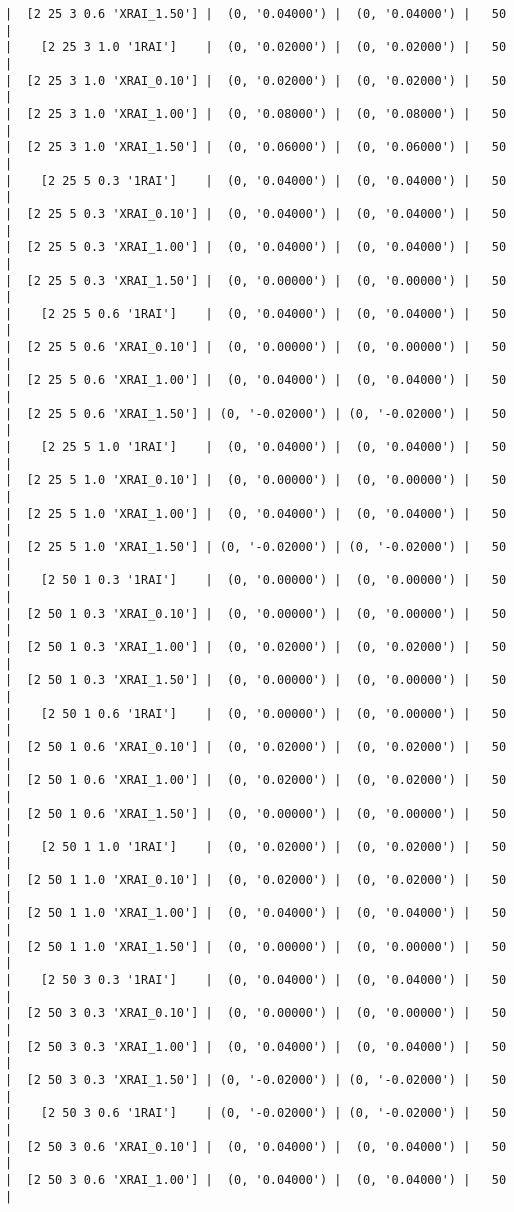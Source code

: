 \documentclass{article}
\begin{document}
\begin{verbatim}
|  [2 25 3 0.6 'XRAI_1.50'] |  (0, '0.04000') |  (0, '0.04000') |   50  |
|    [2 25 3 1.0 '1RAI']    |  (0, '0.02000') |  (0, '0.02000') |   50  |
|  [2 25 3 1.0 'XRAI_0.10'] |  (0, '0.02000') |  (0, '0.02000') |   50  |
|  [2 25 3 1.0 'XRAI_1.00'] |  (0, '0.08000') |  (0, '0.08000') |   50  |
|  [2 25 3 1.0 'XRAI_1.50'] |  (0, '0.06000') |  (0, '0.06000') |   50  |
|    [2 25 5 0.3 '1RAI']    |  (0, '0.04000') |  (0, '0.04000') |   50  |
|  [2 25 5 0.3 'XRAI_0.10'] |  (0, '0.04000') |  (0, '0.04000') |   50  |
|  [2 25 5 0.3 'XRAI_1.00'] |  (0, '0.04000') |  (0, '0.04000') |   50  |
|  [2 25 5 0.3 'XRAI_1.50'] |  (0, '0.00000') |  (0, '0.00000') |   50  |
|    [2 25 5 0.6 '1RAI']    |  (0, '0.04000') |  (0, '0.04000') |   50  |
|  [2 25 5 0.6 'XRAI_0.10'] |  (0, '0.00000') |  (0, '0.00000') |   50  |
|  [2 25 5 0.6 'XRAI_1.00'] |  (0, '0.04000') |  (0, '0.04000') |   50  |
|  [2 25 5 0.6 'XRAI_1.50'] | (0, '-0.02000') | (0, '-0.02000') |   50  |
|    [2 25 5 1.0 '1RAI']    |  (0, '0.04000') |  (0, '0.04000') |   50  |
|  [2 25 5 1.0 'XRAI_0.10'] |  (0, '0.00000') |  (0, '0.00000') |   50  |
|  [2 25 5 1.0 'XRAI_1.00'] |  (0, '0.04000') |  (0, '0.04000') |   50  |
|  [2 25 5 1.0 'XRAI_1.50'] | (0, '-0.02000') | (0, '-0.02000') |   50  |
|    [2 50 1 0.3 '1RAI']    |  (0, '0.00000') |  (0, '0.00000') |   50  |
|  [2 50 1 0.3 'XRAI_0.10'] |  (0, '0.00000') |  (0, '0.00000') |   50  |
|  [2 50 1 0.3 'XRAI_1.00'] |  (0, '0.02000') |  (0, '0.02000') |   50  |
|  [2 50 1 0.3 'XRAI_1.50'] |  (0, '0.00000') |  (0, '0.00000') |   50  |
|    [2 50 1 0.6 '1RAI']    |  (0, '0.00000') |  (0, '0.00000') |   50  |
|  [2 50 1 0.6 'XRAI_0.10'] |  (0, '0.02000') |  (0, '0.02000') |   50  |
|  [2 50 1 0.6 'XRAI_1.00'] |  (0, '0.02000') |  (0, '0.02000') |   50  |
|  [2 50 1 0.6 'XRAI_1.50'] |  (0, '0.00000') |  (0, '0.00000') |   50  |
|    [2 50 1 1.0 '1RAI']    |  (0, '0.02000') |  (0, '0.02000') |   50  |
|  [2 50 1 1.0 'XRAI_0.10'] |  (0, '0.02000') |  (0, '0.02000') |   50  |
|  [2 50 1 1.0 'XRAI_1.00'] |  (0, '0.04000') |  (0, '0.04000') |   50  |
|  [2 50 1 1.0 'XRAI_1.50'] |  (0, '0.00000') |  (0, '0.00000') |   50  |
|    [2 50 3 0.3 '1RAI']    |  (0, '0.04000') |  (0, '0.04000') |   50  |
|  [2 50 3 0.3 'XRAI_0.10'] |  (0, '0.00000') |  (0, '0.00000') |   50  |
|  [2 50 3 0.3 'XRAI_1.00'] |  (0, '0.04000') |  (0, '0.04000') |   50  |
|  [2 50 3 0.3 'XRAI_1.50'] | (0, '-0.02000') | (0, '-0.02000') |   50  |
|    [2 50 3 0.6 '1RAI']    | (0, '-0.02000') | (0, '-0.02000') |   50  |
|  [2 50 3 0.6 'XRAI_0.10'] |  (0, '0.04000') |  (0, '0.04000') |   50  |
|  [2 50 3 0.6 'XRAI_1.00'] |  (0, '0.04000') |  (0, '0.04000') |   50  |

\end{verbatim}
\end{document}
